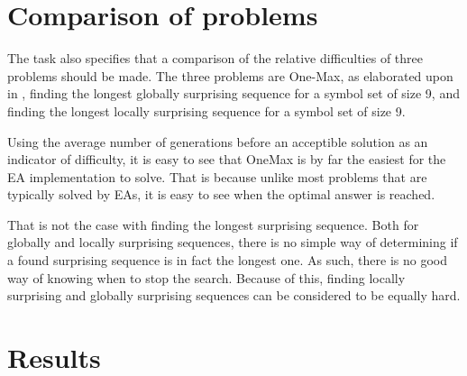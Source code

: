 \documentclass{article}
\begin{document}
\section{Comparison of problems}

The task also specifies that a comparison of the relative difficulties of three problems should be made.
The three problems are One-Max, as elaborated upon in \cite{onemax}, finding the longest globally surprising sequence for a symbol set of size 9, and finding the longest locally surprising sequence for a symbol set of size 9.

Using the average number of generations before an acceptible solution as an indicator of difficulty, it is easy to see that OneMax is by far the easiest for the EA implementation to solve.
That is because unlike most problems that are typically solved by EAs, it is easy to see when the optimal answer is reached.

That is not the case with finding the longest surprising sequence.
Both for globally and locally surprising sequences, there is no simple way of determining if a found surprising sequence is in fact the longest one.
As such, there is no good way of knowing when to stop the search.
Because of this, finding locally surprising and globally surprising sequences can be considered to be equally hard.

\section{Results}


\restoregeometry
\end{document}
